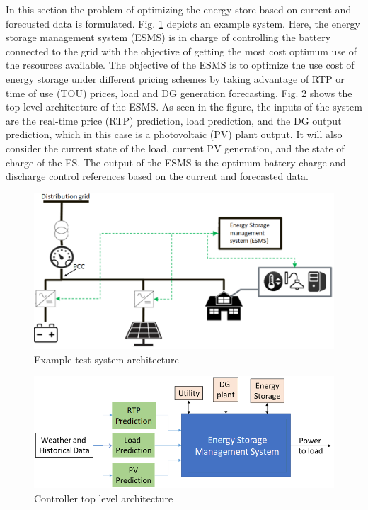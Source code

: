 In this section the problem of optimizing the energy store based on current and forecusted data is formulated. Fig. \ref{fig:system_arch} depicts an example system. Here, the energy storage management system (ESMS) is in charge of controlling the battery connected to the grid with the objective of getting the most cost optimum use of the resources available. The objective of the ESMS is to optimize the use cost of energy storage under different pricing schemes by taking advantage of RTP or time of use (TOU) prices, load and DG generation forecasting.  Fig. \ref{fig:F1_CA} shows the top-level architecture of the ESMS. As seen in the figure, the inputs of the system are the real-time price (RTP) prediction, load prediction, and the DG output prediction, which in this case is a photovoltaic (PV) plant output. It will also consider the current state of the load, current PV generation, and the state of charge of the ES. The output of the ESMS is the optimum battery charge and discharge control references based on the current and forecasted data.

\begin{figure}[!htbp]
\centering
\includegraphics[width=0.6\linewidth]{figs/A8/System_architecture.png}
\caption{Example test system architecture}
\label{fig:system_arch}
\vspace{-3mm}
\end{figure}


\begin{figure}[!ht]
    \centering
    \includegraphics[width = 0.8\linewidth]{figs/A8/EMS_FIG.png}
    \caption{Controller top level architecture}
    \label{fig:F1_CA}
\end{figure}

